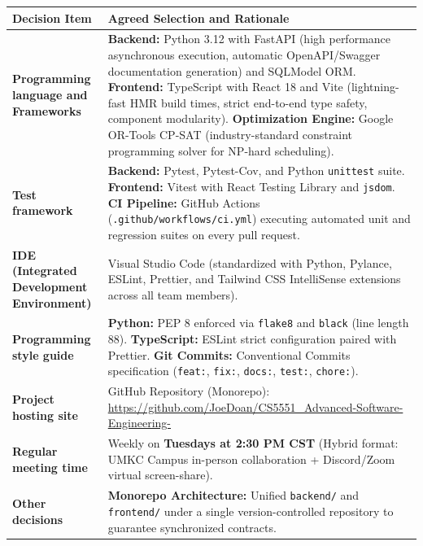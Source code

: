 \documentclass[11pt,letterpaper]{article}
\begin{document}
\vspace{0.4em}
\renewcommand{\arraystretch}{1.32}
\noindent
\begin{tabularx}{\textwidth}{|p{4.8cm}|X|}
\hline
\rowcolor{tableheader}
\textbf{\sffamily Decision Item} & \textbf{\sffamily Agreed Selection and Rationale} \\ \hline
\textbf{Programming language and Frameworks} & \textbf{Backend:} Python 3.12 with FastAPI (high performance asynchronous execution, automatic OpenAPI/Swagger documentation generation) and SQLModel ORM.\newline
\textbf{Frontend:} TypeScript with React 18 and Vite (lightning-fast HMR build times, strict end-to-end type safety, component modularity).\newline
\textbf{Optimization Engine:} Google OR-Tools CP-SAT (industry-standard constraint programming solver for NP-hard scheduling). \\ \hline
\textbf{Test framework} & \textbf{Backend:} Pytest, Pytest-Cov, and Python \texttt{unittest} suite.\newline
\textbf{Frontend:} Vitest with React Testing Library and \texttt{jsdom}.\newline
\textbf{CI Pipeline:} GitHub Actions (\texttt{.github/workflows/ci.yml}) executing automated unit and regression suites on every pull request. \\ \hline
\textbf{IDE (Integrated Development Environment)} & Visual Studio Code (standardized with Python, Pylance, ESLint, Prettier, and Tailwind CSS IntelliSense extensions across all team members). \\ \hline
\textbf{Programming style guide} & \textbf{Python:} PEP 8 enforced via \texttt{flake8} and \texttt{black} (line length 88).\newline
\textbf{TypeScript:} ESLint strict configuration paired with Prettier.\newline
\textbf{Git Commits:} Conventional Commits specification (\texttt{feat:}, \texttt{fix:}, \texttt{docs:}, \texttt{test:}, \texttt{chore:}). \\ \hline
\textbf{Project hosting site} & GitHub Repository (Monorepo):\newline
\url{https://github.com/JoeDoan/CS5551_Advanced-Software-Engineering-} \\ \hline
\textbf{Regular meeting time} & Weekly on \textbf{Tuesdays at 2:30 PM CST} (Hybrid format: UMKC Campus in-person collaboration + Discord/Zoom virtual screen-share). \\ \hline
\textbf{Other decisions} & \textbf{Monorepo Architecture:} Unified \texttt{backend/} and \texttt{frontend/} under a single version-controlled repository to guarantee synchronized contracts.\newline

\end{tabularx}
\end{document}
